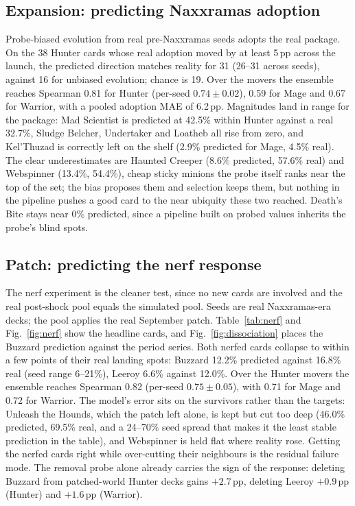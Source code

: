 \documentclass[conference]{IEEEtran}
\newcommand{\pp}{\,\text{pp}}
\begin{document}
\subsection{Expansion: predicting Naxxramas adoption}
Probe-biased evolution from real pre-Naxxramas seeds adopts the real
package. On the 38 Hunter cards whose real adoption moved by at
least 5$\pp$ across the launch, the predicted direction matches
reality for 31 (26--31 across seeds), against 16 for unbiased
evolution; chance is 19. Over the movers the ensemble reaches
Spearman 0.81 for Hunter (per-seed $0.74\pm0.02$), 0.59 for Mage
and 0.67 for Warrior, with a pooled adoption MAE of 6.2$\pp$.
Magnitudes land in range for the package: Mad Scientist is
predicted at 42.5\% within Hunter against a real 32.7\%, Sludge
Belcher, Undertaker and Loatheb all rise from zero, and Kel'Thuzad
is correctly left on the shelf (2.9\% predicted for Mage, 4.5\%
real). The clear underestimates are
Haunted Creeper (8.6\% predicted, 57.6\% real) and Webspinner
(13.4\%, 54.4\%), cheap sticky minions the probe itself ranks near
the top of the set; the bias proposes them and selection keeps
them, but nothing in the pipeline pushes a good card to the near
ubiquity these two reached. Death's Bite stays near 0\% predicted,
since a pipeline built on probed values inherits the probe's blind
spots.

\subsection{Patch: predicting the nerf response}
The nerf experiment is the cleaner test, since no new cards are
involved and the real post-shock pool equals the simulated pool.
Seeds are real Naxxramas-era decks; the pool applies the real
September patch. Table~\ref{tab:nerf} and Fig.~\ref{fig:nerf} show
the headline cards, and Fig.~\ref{fig:dissociation} places the
Buzzard prediction against the period series. Both nerfed cards
collapse to within a few points of their real landing spots:
Buzzard 12.2\% predicted against 16.8\% real (seed range
6--21\%), Leeroy 6.6\% against 12.0\%. Over the Hunter movers the
ensemble reaches Spearman 0.82 (per-seed $0.75\pm0.05$), with 0.71
for Mage and 0.72 for Warrior. The model's error sits on the
survivors rather than the targets: Unleash the Hounds, which the
patch left alone, is kept but cut too deep (46.0\% predicted,
69.5\% real, and a 24--70\% seed spread that makes it the least
stable prediction in the table), and Webspinner is held flat where
reality rose. Getting the nerfed cards right while over-cutting
their neighbours is the residual failure mode. The removal
probe alone already carries the sign of the response: deleting
Buzzard from patched-world Hunter decks gains $+2.7\pp$, deleting
Leeroy $+0.9\pp$ (Hunter) and $+1.6\pp$ (Warrior).
\end{document}
